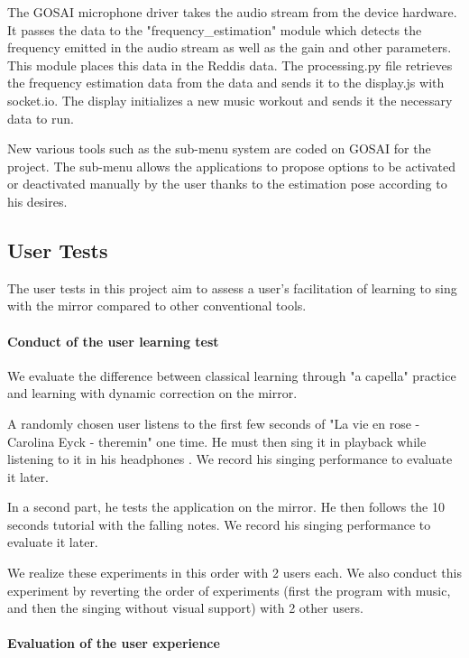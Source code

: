 The GOSAI microphone driver takes the audio stream from the device hardware. It passes the data to the "frequency\_estimation" module which detects the frequency emitted in the audio stream as well as the gain and other parameters. This module places this data in the Reddis data. The processing.py file retrieves the frequency estimation data from the data and sends it to the display.js with socket.io. The display initializes a new music workout and sends it the necessary data to run.

New various tools such as the sub-menu system are coded on GOSAI for the project. The sub-menu allows the applications to propose options to be activated or deactivated manually by the user thanks to the estimation pose according to his desires.

\subsection{User Tests}

The user tests in this project aim to assess a user’s facilitation of learning to sing with the
mirror compared to other conventional tools.

\paragraph{Conduct of the user learning test}

We evaluate the difference between classical learning through "a capella" practice and learning with dynamic correction on the mirror. 

A randomly chosen user listens to the first few seconds of "La vie en rose - Carolina Eyck - theremin"  \cite{carolina_eyck_theremine} one time. He must then sing it in playback while listening to it in his headphones .
We record his singing performance to evaluate it later.

In a second part, he tests the application on the mirror. He then follows the 10 seconds tutorial with the falling notes. We record his singing performance to evaluate it later.

We realize these experiments in this order with 2 users each. We also conduct this experiment by reverting the order of experiments (first the program with music, and then the singing without visual support) with 2 other users.

\paragraph{Evaluation of the user experience}
\label{sec:eval_user_exp}

